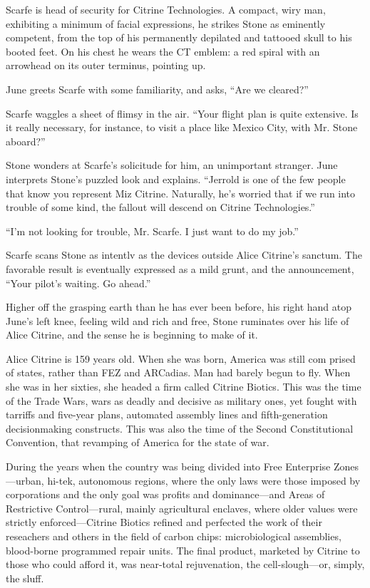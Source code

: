 Scarfe is head of security for Citrine Technologies. A compact, wiry man, exhibiting a minimum of facial expressions, he strikes Stone as eminently competent, from the top of his permanently depilated and tattooed skull to his booted feet. On his chest he wears the CT emblem: a red spiral with an arrowhead on its outer terminus, pointing up.

June greets Scarfe with some familiarity, and asks, “Are we cleared?”

Scarfe waggles a sheet of flimsy in the air. “Your flight plan is quite extensive. Is it really necessary, for instance, to visit a place like Mexico City, with Mr. Stone aboard?”

Stone wonders at Scarfe’s solicitude for him, an unimportant stranger. June interprets Stone’s puzzled look and explains. “Jerrold is one of the few people that know you represent Miz Citrine. Naturally, he’s worried that if we run into trouble of some kind, the fallout will descend on Citrine Technologies.”

“I’m not looking for trouble, Mr. Scarfe. I just want to do my job.”

Scarfe scans Stone as intentlv as the devices outside Alice Citrine’s sanctum. The favorable result is eventually expressed as a mild grunt, and the announcement, “Your pilot’s waiting. Go ahead.”

Higher off the grasping earth than he has ever been before, his right hand atop June’s left knee, feeling wild and rich and free, Stone ruminates over his life of Alice Citrine, and the sense he is beginning to make of it.

Alice Citrine is 159 years old. When she was born, America was still com prised of states, rather than FEZ and ARCadias. Man had barely begun to fly. When she was in her sixties, she headed a firm called Citrine Biotics. This was the time of the Trade Wars, wars as deadly and decisive as military ones, yet fought with tarriffs and five-year plans, automated assembly lines and fifth-generation decisionmaking constructs. This was also the time of the Second Constitutional Convention, that revamping of America for the state of war.

During the years when the country was being divided into Free Enterprise Zones—urban, hi-tek, autonomous regions, where the only laws were those imposed by corporations and the only goal was profits and dominance—and Areas of Restrictive Control—rural, mainly agricultural enclaves, where older values were strictly enforced—Citrine Biotics refined and perfected the work of their reseachers and others in the field of carbon chips: microbiological assemblies, blood-borne programmed repair units. The final product, marketed by Citrine to those who could afford it, was near-total rejuvenation, the cell-slough—or, simply, the sluff.

